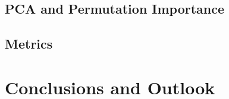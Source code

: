 \documentclass{article}
\begin{document}
\subsection{PCA and Permutation Importance}

\subsection{Metrics}




\section{Conclusions and Outlook}









\end{document}
